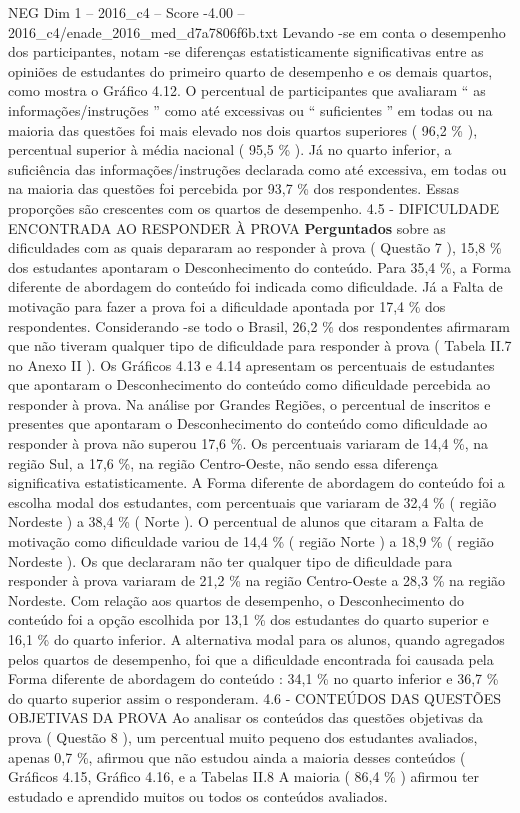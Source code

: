\begin{textsample}{NEG Dim 1 – 2016\_c4 – Score -4.00 – 2016\_c4/enade\_2016\_med\_d7a7806f6b.txt}
Levando -se em conta o desempenho dos participantes, notam -se diferenças estatisticamente significativas entre as opiniões de estudantes do primeiro quarto de desempenho e os demais quartos, como mostra o Gráfico 4.12.
O percentual de participantes que avaliaram “ as informações/instruções ” como até excessivas ou “ suficientes ” em todas ou na maioria das questões foi mais elevado nos dois quartos superiores ( 96,2 \% ), percentual superior à média nacional ( 95,5 \% ).
Já no quarto inferior, a suficiência das informações/instruções declarada como até excessiva, em todas ou na maioria das questões foi percebida por 93,7 \% dos respondentes.
Essas proporções são crescentes com os quartos de desempenho. 4.5 - DIFICULDADE ENCONTRADA AO RESPONDER À PROVA \textbf{Perguntados} sobre as dificuldades com as quais depararam ao responder à prova ( Questão 7 ), 15,8 \% dos estudantes apontaram o Desconhecimento do conteúdo.
Para 35,4 \%, a Forma diferente de abordagem do conteúdo foi indicada como dificuldade.
Já a Falta de motivação para fazer a prova foi a dificuldade apontada por 17,4 \% dos respondentes.
Considerando -se todo o Brasil, 26,2 \% dos respondentes afirmaram que não tiveram qualquer tipo de dificuldade para responder à prova ( Tabela II.7 no Anexo II ).
Os Gráficos 4.13 e 4.14 apresentam os percentuais de estudantes que apontaram o Desconhecimento do conteúdo como dificuldade percebida ao responder à prova.
Na análise por Grandes Regiões, o percentual de inscritos e presentes que apontaram o Desconhecimento do conteúdo como dificuldade ao responder à prova não superou 17,6 \%.
Os percentuais variaram de 14,4 \%, na região Sul, a 17,6 \%, na região Centro-Oeste, não sendo essa diferença significativa estatisticamente.
A Forma diferente de abordagem do conteúdo foi a escolha modal dos estudantes, com percentuais que variaram de 32,4 \% ( região Nordeste ) a 38,4 \% ( Norte ).
O percentual de alunos que citaram a Falta de motivação como dificuldade variou de 14,4 \% ( região Norte ) a 18,9 \% ( região Nordeste ).
Os que declararam não ter qualquer tipo de dificuldade para responder à prova variaram de 21,2 \% na região Centro-Oeste a 28,3 \% na região Nordeste.
Com relação aos quartos de desempenho, o Desconhecimento do conteúdo foi a opção escolhida por 13,1 \% dos estudantes do quarto superior e 16,1 \% do quarto inferior.
A alternativa modal para os alunos, quando agregados pelos quartos de desempenho, foi que a dificuldade encontrada foi causada pela Forma diferente de abordagem do conteúdo : 34,1 \% no quarto inferior e 36,7 \% do quarto superior assim o responderam. 4.6 - CONTEÚDOS DAS QUESTÕES OBJETIVAS DA PROVA Ao analisar os conteúdos das questões objetivas da prova ( Questão 8 ), um percentual muito pequeno dos estudantes avaliados, apenas 0,7 \%, afirmou que não estudou ainda a maioria desses conteúdos ( Gráficos 4.15, Gráfico 4.16, e a Tabelas II.8 A maioria ( 86,4 \% ) afirmou ter estudado e aprendido muitos ou todos os conteúdos avaliados.

\end{textsample}
